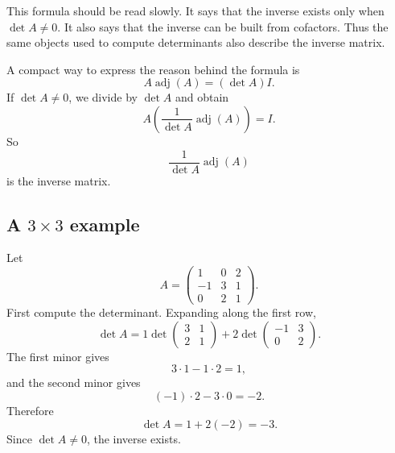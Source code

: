 This formula should be read slowly. It says that the inverse exists only when \(\det A\ne0\). It also says that the inverse can be built from cofactors. Thus the same objects used to compute determinants also describe the inverse matrix.

A compact way to express the reason behind the formula is
\[
A\operatorname{adj}(A)=(\det A)I.
\]
If \(\det A\ne0\), we divide by \(\det A\) and obtain
\[
A\left(\frac{1}{\det A}\operatorname{adj}(A)\right)=I.
\]
So
\[
\frac{1}{\det A}\operatorname{adj}(A)
\]
is the inverse matrix.

\subsection{A \(3\times3\) example}

Let
\[
A=\begin{pmatrix}
1&0&2\\
-1&3&1\\
0&2&1
\end{pmatrix}.
\]
First compute the determinant. Expanding along the first row,
\[
\det A
=1\det\begin{pmatrix}3&1\\2&1\end{pmatrix}
+2\det\begin{pmatrix}-1&3\\0&2\end{pmatrix}.
\]
The first minor gives
\[
3\cdot1-1\cdot2=1,
\]
and the second minor gives
\[
(-1)\cdot2-3\cdot0=-2.
\]
Therefore
\[
\det A=1+2(-2)=-3.
\]
Since \(\det A\ne0\), the inverse exists.

